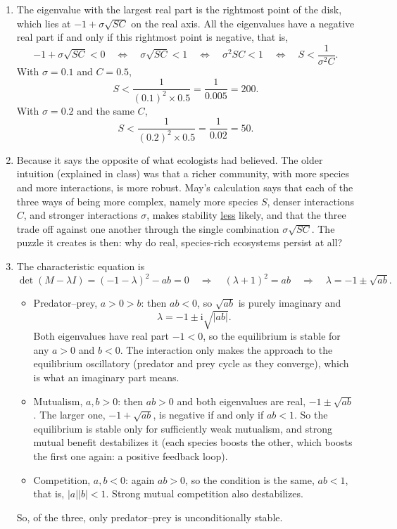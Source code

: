 \documentclass[a4paper,12pt]{article}
\begin{document}
\begin{enumerate}[label=(\alph*)]
\item The eigenvalue with the largest real part is the rightmost point of the disk, which lies at $-1 + \sigma\sqrt{SC}$ on the real axis. All the eigenvalues have a negative real part if and only if this rightmost point is negative, that is,
\[ -1+\sigma\sqrt{SC} < 0
\quad\Longleftrightarrow\quad
\sigma\sqrt{SC}<1
\quad\Longleftrightarrow\quad
\sigma^2 SC<1
\quad\Longleftrightarrow\quad
S < \frac{1}{\sigma^2 C} . \]
With $\sigma=0.1$ and $C=0.5$,
\[ S < \frac{1}{(0.1)^2 \times 0.5} = \frac{1}{0.005} = 200 . \]
With $\sigma=0.2$ and the same $C$,
\[ S < \frac{1}{(0.2)^2 \times 0.5} = \frac{1}{0.02} = 50 . \]

\item Because it says the opposite of what ecologists had believed. The older intuition (explained in class) was that a richer community, with more species and more interactions, is more robust. May's calculation says that each of the three ways of being more complex, namely more species $S$, denser interactions $C$, and stronger interactions $\sigma$, makes stability \underline{less} likely, and that the three trade off against one another through the single combination $\sigma\sqrt{SC}$. The puzzle it creates is then: why do real, species-rich ecosystems persist at all?

\item The characteristic equation is
\[ \det\left( M-\lambda I \right) = (-1-\lambda)^2 - ab = 0
\quad\Longrightarrow\quad
(\lambda+1)^2 = ab
\quad\Longrightarrow\quad
\lambda = -1 \pm \sqrt{ab} . \]
\begin{itemize}
\item Predator--prey, $a>0>b$: then $ab<0$, so $\sqrt{ab}$ is purely imaginary and
\[ \lambda = -1 \pm \text{i}\sqrt{\left| ab \right|} . \]
Both eigenvalues have real part $-1<0$, so the equilibrium is stable for any $a>0$ and $b<0$. The interaction only makes the approach to the equilibrium oscillatory (predator and prey cycle as they converge), which is what an imaginary part means.
\item Mutualism, $a,b>0$: then $ab>0$ and both eigenvalues are real, $-1\pm\sqrt{ab}$. The larger one, $-1+\sqrt{ab}$, is negative if and only if $ab<1$. So the equilibrium is stable only for sufficiently weak mutualism, and strong mutual benefit destabilizes it (each species boosts the other, which boosts the first one again: a positive feedback loop).
\item Competition, $a,b<0$: again $ab>0$, so the condition is the same, $ab<1$, that is, $\left| a \right|\left| b \right|<1$. Strong mutual competition also destabilizes.
\end{itemize}
So, of the three, only predator--prey is unconditionally stable.


\end{enumerate}
\end{document}
